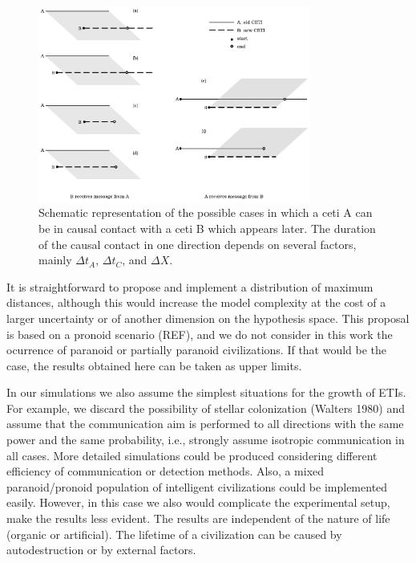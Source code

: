 \documentclass[crop]{CSLB}%
\begin{document}
\begin{figure}
   \centering
   \includegraphics[width=0.8\textwidth]{Messages_01.pdf}
   \caption{Schematic representation of the possible cases in which a
   ceti A can be in causal contact with a ceti B which appears later.
   The duration of the causal contact in one direction depends on
   several factors, mainly $\Delta t_A$, $\Delta t_C$, and $\Delta X$.}
   \label{F_messages}
\end{figure}
                     



%
It is straightforward to propose and implement a distribution of
maximum distances, although this would increase the model complexity
at the cost of a larger uncertainty or of another dimension on the
hypothesis space.
%
This proposal is based on a pronoid scenario (REF), and we do not
consider in this work the ocurrence of paranoid or partially paranoid
civilizations.
%
If that would be the case, the results obtained here can be taken as
upper limits.



In our simulations we also assume the simplest situations for the
growth of ETIs.
%
For example, we discard the possibility of stellar colonization
(Walters 1980) and assume that the communication aim is performed to
all directions with the same power and the same probability, i.e.,
strongly assume isotropic communication in all cases.
%
More detailed simulations could be produced considering different 
efficiency of communication or detection methods.
%
Also, a mixed paranoid/pronoid population of intelligent civilizations
could be implemented easily.
%
However, in this case we also would complicate the experimental setup,
make the results less evident.
%
The results are independent of the nature of life (organic or
artificial).
%
The lifetime of a civilization can be caused by autodestruction or by
external factors.
\end{document}
